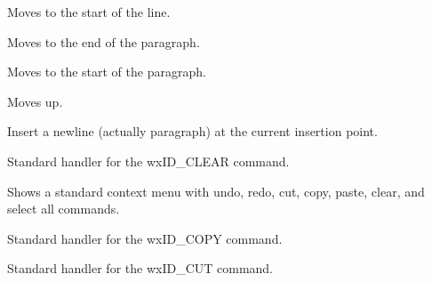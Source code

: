 
Moves to the start of the line.

\label{wxrichtextctrlmovetoparagraphend}


Moves to the end of the paragraph.

\label{wxrichtextctrlmovetoparagraphstart}


Moves to the start of the paragraph.

\label{wxrichtextctrlmoveup}


Moves up.

\label{wxrichtextctrlnewline}


Insert a newline (actually paragraph) at the current insertion point.

\label{wxrichtextctrlonclear}


Standard handler for the wxID\_CLEAR command.

\label{wxrichtextctrloncontextmenu}


Shows a standard context menu with undo, redo, cut, copy, paste, clear, and select all commands.

\label{wxrichtextctrloncopy}


Standard handler for the wxID\_COPY command.

\label{wxrichtextctrloncut}


Standard handler for the wxID\_CUT command.

\label{wxrichtextctrlondropfiles}

